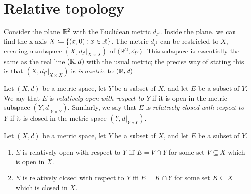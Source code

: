 \section{Relative topology}\label{ii:sec:1.3}

\begin{note}
  Consider the plane \(\mathbb{R}^2\) with the Euclidean metric \(d_{l^2}\).
  Inside the plane, we can find the x-axis \(X \coloneqq \left\lbrace(x, 0) : x \in \mathbb{R}\right\rbrace\).
  The metric \(d_{l^2}\) can be restricted to \(X\), creating a subspace \((X, d_{l^2}|_{X \times X})\) of \((\mathbb{R}^2, d_{l^2})\).
  This subspace is essentially the same as the real line \((\mathbb{R}, d)\) with the usual metric;
  the precise way of stating this is that \((X, d_{l^2}|_{X \times X})\) is \emph{isometric} to \((\mathbb{R}, d)\).
\end{note}

\setcounter{thm}{2}
\begin{defn}\label{ii:1.3.3}
  Let \((X, d)\) be a metric space, let \(Y\) be a subset of \(X\), and let \(E\) be a subset of \(Y\).
  We say that \(E\) is \emph{relatively open with respect to \(Y\)} if it is open in the metric subspace \((Y, d|_{Y \times Y})\).
  Similarly, we say that \(E\) is \emph{relatively closed with respect to \(Y\)} if it is closed in the metric space \((Y, d|_{Y \times Y})\).
\end{defn}

\begin{prop}\label{ii:1.3.4}
  Let \((X, d)\) be a metric space, let \(Y\) be a subset of \(X\), and let \(E\) be a subset of \(Y\).
  \begin{enumerate}
    \item \(E\) is relatively open with respect to \(Y\) iff \(E = V \cap Y\) for some set \(V \subseteq X\) which is open in \(X\).
    \item \(E\) is relatively closed with respect to \(Y\) iff \(E = K \cap Y\) for some set \(K \subseteq X\) which is closed in \(X\).
  \end{enumerate}
\end{prop}

